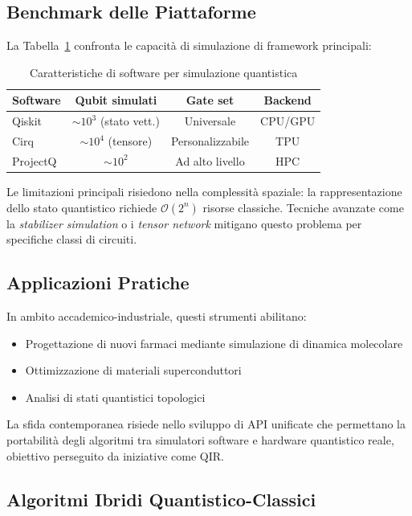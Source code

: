 \documentclass[a4paper,12pt]{report}
\theoremstyle{plain}
\begin{document}
\subsection{Benchmark delle Piattaforme}
La Tabella~\ref{tab:software_quantistici} confronta le capacità di simulazione di framework principali:
\begin{table}[h]
\centering
\caption{Caratteristiche di software per simulazione quantistica}
\label{tab:software_quantistici}
\begin{tabular}{|l|c|c|c|}
\hline
\textbf{Software} & \textbf{Qubit simulati} & \textbf{Gate set} & \textbf{Backend} \\ \hline
Qiskit & $\sim 10^3$ (stato vett.) & Universale & CPU/GPU \\ 
Cirq & $\sim 10^4$ (tensore) & Personalizzabile & TPU \\
ProjectQ & $\sim 10^2$ & Ad alto livello & HPC \\ \hline
\end{tabular}
\end{table}

\noindent Le limitazioni principali risiedono nella complessità spaziale: la rappresentazione dello stato quantistico richiede $\mathcal{O}(2^n)$ risorse classiche. Tecniche avanzate come la \textit{stabilizer simulation} o i \textit{tensor network} mitigano questo problema per specifiche classi di circuiti.

\subsection{Applicazioni Pratiche}
In ambito accademico-industriale, questi strumenti abilitano:
\begin{itemize}
    \item Progettazione di nuovi farmaci mediante simulazione di dinamica molecolare
    \item Ottimizzazione di materiali superconduttori
    \item Analisi di stati quantistici topologici
\end{itemize}
La sfida contemporanea risiede nello sviluppo di API unificate che permettano la portabilità degli algoritmi tra simulatori software e hardware quantistico reale, obiettivo perseguito da iniziative come QIR.
\subsection{Algoritmi Ibridi Quantistico-Classici}
\label{subsec:algoritmi-ibridi}
\end{document}
